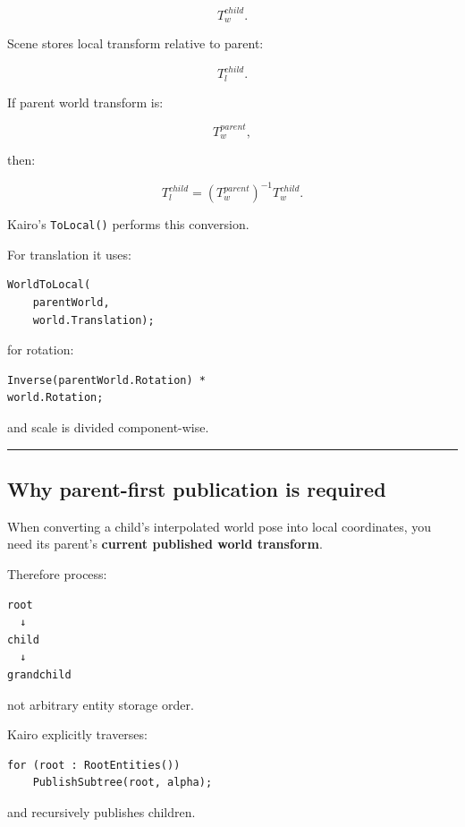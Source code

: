 \[
T_w^{child}.
\]

Scene stores local transform relative to parent:

\[
T_l^{child}.
\]

If parent world transform is:

\[
T_w^{parent},
\]

then:

\[
\boxed{
T_l^{child}
=
(T_w^{parent})^{-1}
T_w^{child}.
}
\]

Kairo's \texttt{ToLocal()} performs this conversion.

For translation it uses:

\begin{verbatim}
WorldToLocal(
    parentWorld,
    world.Translation);
\end{verbatim}

for rotation:

\begin{verbatim}
Inverse(parentWorld.Rotation) *
world.Rotation;
\end{verbatim}

and scale is divided component-wise.

\begin{center}\rule{0.5\linewidth}{0.5pt}\end{center}

\subsection{Why parent-first publication is required}\label{06-engine-ii-ch037-why-parent-first-publication-is-required}

\hypertarget{06-engine-ii-ch037-why-parent-first-publication-is-required}{}

When converting a child's interpolated world pose into local coordinates, you need its parent's \textbf{current published world transform}.

Therefore process:

\begin{verbatim}
root
  ↓
child
  ↓
grandchild
\end{verbatim}

not arbitrary entity storage order.

Kairo explicitly traverses:

\begin{verbatim}
for (root : RootEntities())
    PublishSubtree(root, alpha);
\end{verbatim}

and recursively publishes children.

